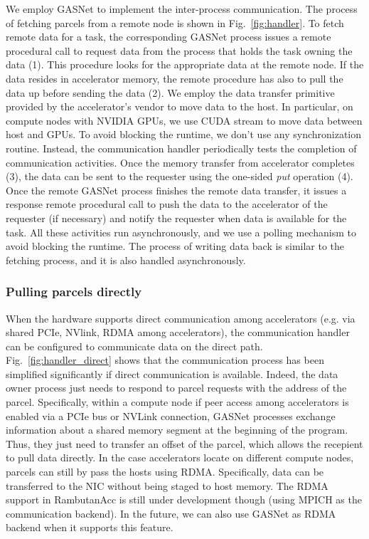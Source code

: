 We employ GASNet to implement the inter-process communication.
The process of fetching parcels from a remote node is shown in Fig.~\ref{fig:handler}.
To fetch remote data for a task, the corresponding GASNet process issues a remote procedural call to request data from the process that holds the task owning the data (1).
This procedure looks for the appropriate data at the remote node.
If the data resides in accelerator memory, the remote procedure has also to pull the data up before sending the data (2).
We employ the data transfer primitive provided by the accelerator's vendor to move data to the host.
In particular, on compute nodes with NVIDIA GPUs, we use CUDA stream to move data between host and GPUs.
To avoid blocking the runtime, we don't use any synchronization routine.
Instead, the communication handler periodically tests the completion of communication activities.
Once the memory transfer from accelerator completes (3), the data can be sent to the requester using the one-sided {\em put} operation (4).
Once the remote GASNet process finishes the remote data transfer, it issues a response remote procedural call to push the data to the accelerator of the requester (if necessary) and notify the requester when data is available for the task.
All these activities run asynchronously, and we use a polling mechanism to avoid blocking the runtime.
The process of writing data back is similar to the fetching process, and it is also handled asynchronously.




\subsubsection{Pulling parcels directly}
When the hardware supports direct communication among accelerators (e.g. via shared PCIe, NVlink, RDMA among accelerators), the communication handler can be configured to communicate data on the direct path.
Fig.~\ref{fig:handler_direct} shows that the communication process has been simplified significantly if direct communication is available.
Indeed, the data owner process just needs to respond to parcel requests with the address of the parcel.
Specifically, within a compute node if peer access among accelerators is enabled via a PCIe bus or NVLink connection, GASNet processes exchange information about a shared memory segment at the beginning of the program. Thus, they just need to transfer an offset of the parcel, which allows the recepient to pull data directly.
In the case accelerators locate on different compute nodes, parcels can still by pass the hosts using RDMA.
Specifically, data can be transferred to the NIC without being staged to host memory.
The RDMA support in RambutanAcc is still under development though (using MPICH as the communication backend).
In the future, we can also use GASNet as RDMA backend when it supports this feature.


